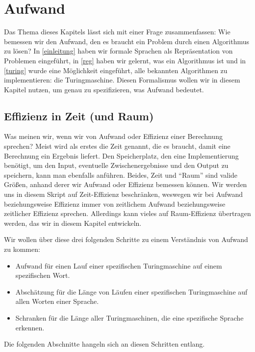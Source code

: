 \chapter{Aufwand}
Das Thema dieses Kapitels lässt sich mit einer Frage zusammenfassen:
Wie bemessen wir den Aufwand,
den es braucht ein Problem durch einen Algorithmus zu lösen?
In \autoref{einleitung} haben wir formale Sprachen als Repräsentation von Problemen eingeführt,
in \autoref{reg} haben wir gelernt, was ein Algorithmus ist und
in \autoref{turing} wurde eine Möglichkeit eingeführt,
alle bekannten Algorithmen zu implementieren:
die Turingmaschine.
Diesen Formalismus wollen wir in diesem Kapitel nutzen,
um genau zu spezifizieren,
was Aufwand bedeutet.

\section{Effizienz in Zeit (und Raum)}

Was meinen wir, wenn wir von Aufwand oder Effizienz einer Berechnung sprechen?
Meist wird als erstes die Zeit genannt,
die es braucht,
damit eine Berechnung ein Ergebnis liefert.
Den Speicherplatz,
den eine Implementierung benötigt,
um den Input,
eventuelle Zwischenergebnisse
und den Output zu speichern,
kann man ebenfalls anführen.
Beides, Zeit und ``Raum'' sind valide Größen,
anhand derer wir Aufwand oder Effizienz bemessen können.
Wir werden uns in diesem Skript auf Zeit-Effizienz beschränken,
weswegen wir bei Aufwand beziehungsweise Effizienz immer von
zeitlichem Aufwand beziehungsweise zeitlicher Effizienz sprechen.
Allerdings kann vieles auf Raum-Effizienz übertragen werden,
das wir in diesem Kapitel entwickeln.

Wir wollen über diese drei folgenden Schritte zu einem Verständnis von Aufwand zu kommen:
\begin{itemize}
    \item Aufwand für einen Lauf einer spezifischen Turingmaschine auf einem spezifischen Wort.
    \item Abschätzung für die Länge von Läufen einer spezifischen Turingmaschine
        auf allen Worten einer Sprache.
    \item Schranken für die Länge aller Turingmaschinen, die eine spezifische Sprache erkennen.
\end{itemize}

Die folgenden Abschnitte hangeln sich an diesen Schritten entlang.


